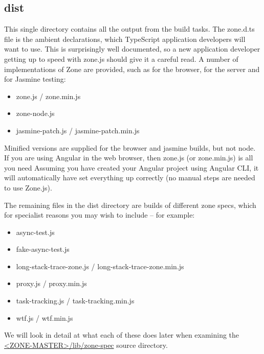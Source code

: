 \subsection{dist}

This single directory contains all the output from the build tasks. The zone.d.ts file is
the ambient declarations, which TypeScript application developers will want to use.
This is surprisingly well documented, so a new application developer getting up to
speed with zone.js should give it a careful read. A number of implementations of Zone
are provided, such as for the browser, for the server and for Jasmine testing:

\begin{itemize}
  \item zone.js / zone.min.js
  \item zone-node.js
  \item jasmine-patch.js / jasmine-patch.min.js
\end{itemize}

Minified versions are supplied for the browser and jasmine builds, but not node. If you
are using Angular in the web browser, then zone.js (or zone.min.js) is all you need
Assuming you have created your Angular project using Angular CLI, it will
automatically have set everything up correctly (no manual steps are needed to use
Zone.js).

The remaining files in the dist directory are builds of different zone specs, which for
specialist reasons you may wish to include – for example:

\begin{itemize}
  \item async-test.js
  \item fake-async-test.js
  \item long-stack-trace-zone.js / long-stack-trace-zone.min.js
  \item proxy.js / proxy.min.js
  \item task-tracking.js / task-tracking.min.js
  \item wtf.js / wtf.min.js
\end{itemize}

We will look in detail at what each of these does later when examining the
\href{https://github.com/angular/zone.js/tree/master/lib/zone-spec}
{<ZONE-MASTER>/lib/zone-spec}
source directory.
